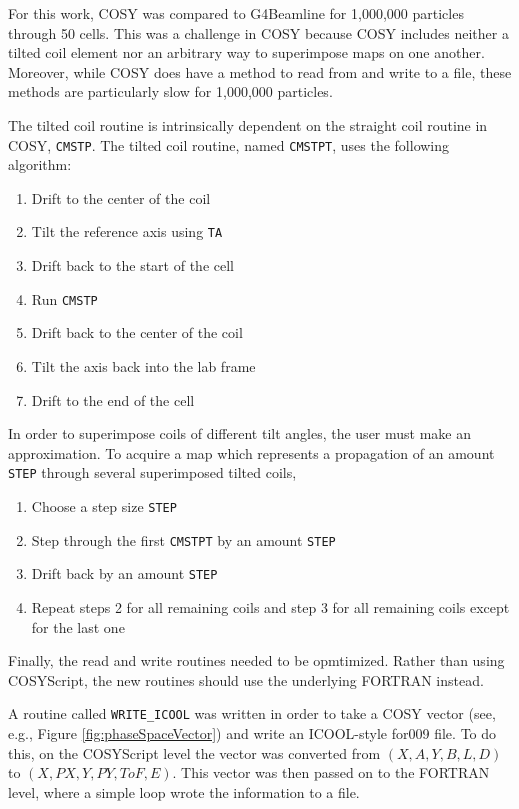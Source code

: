 For this work, COSY was compared to G4Beamline for 1,000,000 particles through 50 cells. This was a challenge in COSY because COSY includes neither a tilted coil element nor an arbitrary way to superimpose maps on one another. Moreover, while COSY does have a method to read from and write to a file, these methods are particularly slow for 1,000,000 particles. 

The tilted coil routine is intrinsically dependent on the straight coil routine in COSY, \verb|CMSTP|. The tilted coil routine, named \verb|CMSTPT|, uses the following algorithm:
\begin{enumerate}
\item{Drift to the center of the coil}
\item{Tilt the reference axis using \verb|TA|}
\item{Drift back to the start of the cell}
\item{Run \verb|CMSTP|}
\item{Drift back to the center of the coil}
\item{Tilt the axis back into the lab frame}
\item{Drift to the end of the cell}
\end{enumerate}

In order to superimpose coils of different tilt angles, the user must make an approximation. To acquire a map which represents a propagation of an amount \verb|STEP| through several superimposed tilted coils,
\begin{enumerate}
\item{Choose a step size \verb|STEP|}
\item{Step through the first \verb|CMSTPT| by an amount \verb|STEP|}
\item{Drift back by an amount \verb|STEP|}
\item{Repeat steps 2 for all remaining coils and step 3 for all remaining coils except for the last one}
\end{enumerate}

Finally, the read and write routines needed to be opmtimized. Rather than using COSYScript, the new routines should use the underlying FORTRAN instead. 

A routine called \verb|WRITE_ICOOL| was written in order to take a COSY vector (see, e.g., Figure \ref{fig:phaseSpaceVector}) and write an ICOOL-style for009 file. To do this, on the COSYScript level the vector was converted from $(X,A,Y,B,L,D)$ to $(X,PX,Y,PY,ToF,E)$. This vector was then passed on to the FORTRAN level, where a simple loop wrote the information to a file.


